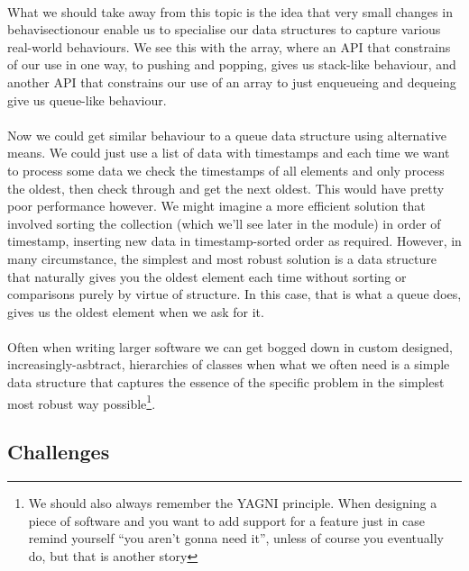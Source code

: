 \documentclass[10pt, a4paper, twosize]{article}
\begin{document}
\paragraph{} What we should take away from this topic is the idea that very small changes in behavisectionour enable us to specialise our data structures to capture various real-world behaviours. We see this with the array, where an API that constrains of our use in one way, to pushing and popping, gives us stack-like behaviour, and another API that constrains our use of an array to just enqueueing and dequeing give us queue-like behaviour.

\paragraph{} Now we could get similar behaviour to a queue data structure using alternative means. We could just use a list of data with timestamps and each time we want to process some data we check the timestamps of all elements and only process the oldest, then check through and get the next oldest. This would have pretty poor performance however. We might imagine a more efficient solution that involved sorting the collection (which we'll see later in the module) in order of timestamp, inserting new data in timestamp-sorted order as required. However, in many circumstance, the simplest and most robust solution is a data structure that naturally gives you the oldest element each time without sorting or comparisons purely by virtue of structure. In this case, that is what a queue does, gives us the oldest element when we ask for it.

\paragraph{} Often when writing larger software we can get bogged down in custom designed, increasingly-asbtract, hierarchies of classes when what we often need is a simple data structure that captures the essence of the specific problem in the simplest most robust way possible\footnote{We should also always remember the YAGNI principle. When designing a piece of software and you want to add support for a feature just in case remind yourself ``you aren't gonna need it'', unless of course you eventually do, but that is another story}.

\subsection{Challenges}
\end{document}
